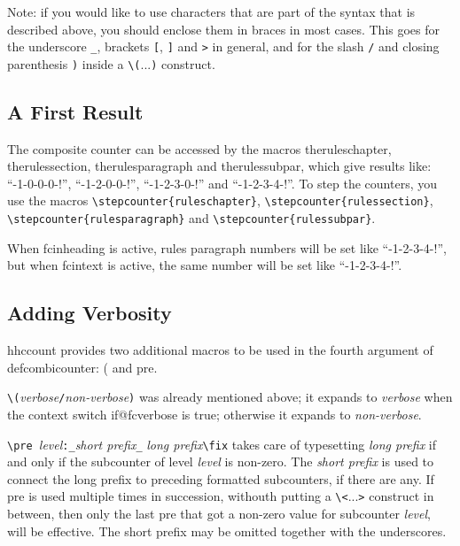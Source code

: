 \documentclass[11pt]{article}
\makeatletter
\def\packagename#1{{\sffamily #1}}     %
\def\macroname#1{{\ttfamily\@ttbs#1}}  %
\def\hhccount{\packagename{hhccount}\xspace}
\def\={\verb=}
\def\<#1>{\macroname{#1}}
\def\:{\linebreak[1]}
\makeatother
\begin{document}
Note: if you would like to use characters that are part of the
syntax that is described above, you should enclose them in braces
in most cases. This goes for the underscore \=_=, brackets
\=[=, \=]= and \=>= in general, and for the slash \=/= and closing
parenthesis \=)= inside a \=\(=...\=)= construct.

\subsection{A First Result}

The composite counter can be accessed by the macros
\<theruleschapter>, \<therulessection>, \<therulesparagraph>
and \<therulessubpar>, which give results like:
``-1-0-0-0-!'',
``-1-2-0-0-!'', ``-1-2-3-0-!''
and ``-1-2-3-4-!''.
To step the counters, you use the macros \=\stepcounter=\:\={ruleschapter}=,
\=\stepcounter=\:\={rulessection}=,
\=\stepcounter=\:\={rulesparagraph}= and
\=\stepcounter=\:\={rulessubpar}=.

When \<fcinheading> is active, rules paragraph numbers will be set like
``{\fcinheading{}-1-2-3-4-!}'', but when \<fcintext> is active,
the same number will be set like ``{\fcintext{}-1-2-3-4-!}''.

\subsection{Adding Verbosity}

\hhccount provides two additional macros to be used in the fourth argument
of \<defcombicounter>: \<(> and \<pre>.

\=\(=\textit{verbose}\=/=\textit{non-verbose}\=)= was already mentioned
above; it expands to \textit{verbose} when the context switch \<if@fcverbose>
is true; otherwise it expands to \textit{non-verbose}.

\=\pre =\textit{level}\=:_=\textit{short prefix}\=_=%
\textit{long prefix}\=\fix= takes care of typesetting \textit{long prefix}
if and only if the subcounter of level \textit{level} is non-zero. The
\textit{short prefix} is used to connect the long prefix to preceding
formatted subcounters, if there are any. If \<pre> is used multiple
times in succession, withouth putting a \=\<=...\=>= construct in between,
then only the last \<pre> that got a non-zero value for subcounter
\textit{level}, will be effective. The short prefix may be omitted
together with the underscores.
\end{document}
